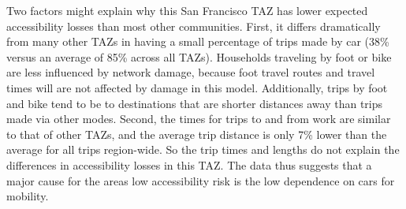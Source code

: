 Two factors might explain why this San Francisco TAZ has lower expected accessibility losses than most other communities.
First, it differs dramatically from many other TAZs in having a small percentage of trips made by car (38\% versus an average of 85\% across all TAZs). Households traveling by foot or bike are less influenced by network damage, because foot travel routes and travel times will are not affected by damage in this model. Additionally, trips by foot and bike tend to be to destinations that are shorter distances away than trips made via other modes. 
 Second, the times for trips to and from work are similar to that of other TAZs, and the average trip distance is only 7\% lower than the average for all trips region-wide. So the trip times and lengths do not explain the differences in accessibility losses in this TAZ.
The data thus suggests that a major cause for the areas low accessibility risk is the low dependence on cars for mobility. 